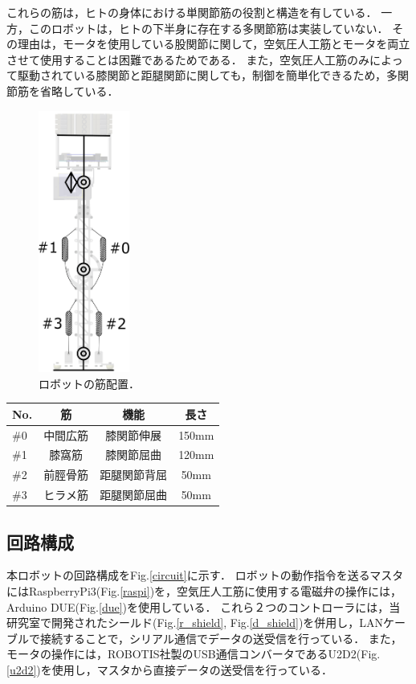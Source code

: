 これらの筋は，ヒトの身体における単関節筋の役割と構造を有している．
一方，このロボットは，ヒトの下半身に存在する多関節筋は実装していない．
その理由は，モータを使用している股関節に関して，空気圧人工筋とモータを両立させて使用することは困難であるためである．
また，空気圧人工筋のみによって駆動されている膝関節と距腿関節に関しても，制御を簡単化できるため，多関節筋を省略している．

\begin{figure}[htbp]
 \centering
 \includegraphics[clip,width=3.0cm]{./fig/robot_cad_muscle.png}
    \caption{ロボットの筋配置．\label{muscle_placement}}
\end{figure}

\begin{table}[htbp]
 \centering
 \begin{tabular}{|l||c|c|c|} \hline
    No. & 筋 & 機能 & 長さ\\ \hline \hline
    \#0 & 中間広筋 & 膝関節伸展 & 150mm \\
    \#1 & 膝窩筋 & 膝関節屈曲 & 120mm \\
    \#2 & 前脛骨筋 & 距腿関節背屈 & 50mm \\
    \#3 & ヒラメ筋 & 距腿関節屈曲 & 50mm \\ \hline
 \end{tabular}
\end{table}




\subsection{回路構成}
本ロボットの回路構成をFig.\ref{circuit}に示す．
ロボットの動作指令を送るマスタにはRaspberryPi3(Fig.\ref{raspi})を，空気圧人工筋に使用する電磁弁の操作には，Arduino DUE(Fig.\ref{due})を使用している．
これら２つのコントローラには，当研究室で開発されたシールド(Fig.\ref{r_shield}, Fig.\ref{d_shield})を併用し，LANケーブルで接続することで，シリアル通信でデータの送受信を行っている．
また，モータの操作には，ROBOTIS社製のUSB通信コンバータであるU2D2(Fig.\ref{u2d2})を使用し，マスタから直接データの送受信を行っている．


